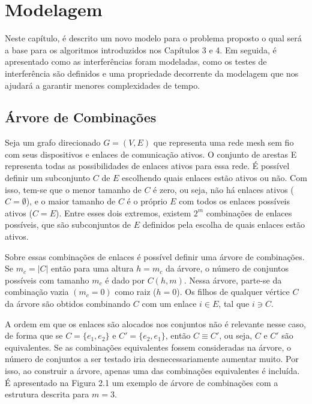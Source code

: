 \chapter{Modelagem}
\label{cap:modelagem}

Neste capítulo, é descrito um novo modelo para o problema proposto o qual será a base para os algoritmos introduzidos nos Capítulos 3 e 4. Em seguida, é apresentado como as interferências foram modeladas, como os testes de interferência são definidos e uma propriedade decorrente da modelagem que nos ajudará a garantir menores complexidades de tempo.


\section{Árvore de Combinações}

Seja um grafo direcionado $G=(V,E)$ que representa uma rede mesh sem fio com seus dispositivos e enlaces de comunicação ativos. O conjunto de arestas E representa todas as possibilidades de enlaces ativos para essa rede. É possível definir um subconjunto $C$ de $E$ escolhendo quais enlaces estão ativos ou não. Com isso, tem-se que o menor tamanho de $C$ é zero, ou seja, não há enlaces ativos ($C=\emptyset$), e o maior tamanho de $C$ é o próprio $E$ com todos os enlaces possíveis ativos ($C=E$). Entre esses dois extremos, existem $2^m$ combinações de enlaces possíveis, que são subconjuntos de $E$ definidos pela escolha de quais enlaces estão ativos.

Sobre essas combinações de enlaces é possível definir uma árvore de combinações. Se $m_{c} = |C|$ então para uma altura $h=m_{c}$ da árvore, o número de conjuntos possíveis com tamanho $m_{c}$ é dado por $C(h,m)$. Nessa árvore, parte-se da combinação vazia $(m_{c}=0)$ como raiz ($h=0$). Os filhos de qualquer vértice $C$ da árvore são obtidos combinando $C$ com um enlace $i \in E$, tal que $i \ni C$. 

A ordem em que os enlaces são alocados nos conjuntos não é relevante nesse caso, de forma que se $C=\{e_{1}, e_{2}\}$ e $C'=\{e_{2},e_{1}\}$, então $C \equiv C'$, ou seja, $C$ e $C'$ são equivalentes. Se as combinações equivalentes fossem consideradas na árvore, o número de conjuntos a ser testado iria desnecessariamente aumentar muito. Por isso, ao construir a árvore, apenas uma das combinações equivalentes é incluída. É apresentado na Figura 2.1 um exemplo de árvore de combinações com a estrutura descrita para $m=3$.


